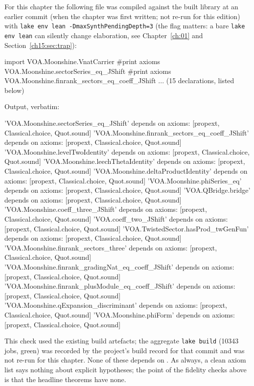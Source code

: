 For this chapter the following file was compiled against the built library at an earlier commit
(when the chapter was first written; not re-run for this edition) with \texttt{lake env lean -DmaxSynthPendingDepth=3} (the flag matters: a bare
\texttt{lake env lean} can silently change elaboration, see Chapter~\ref{ch:01} and Section~\ref{ch15:sec:trap}):
\begin{plaincode}
import VOA.Moonshine.VnatCarrier
#print axioms VOA.Moonshine.sectorSeries_eq_JShift
#print axioms VOA.Moonshine.finrank_sectors_eq_coeff_JShift
... (15 declarations, listed below)
\end{plaincode}
Output, verbatim:
\begin{plaincode}
'VOA.Moonshine.sectorSeries_eq_JShift' depends on axioms: [propext, Classical.choice, Quot.sound]
'VOA.Moonshine.finrank_sectors_eq_coeff_JShift' depends on axioms: [propext, Classical.choice, Quot.sound]
'VOA.Moonshine.levelTwoIdentity' depends on axioms: [propext, Classical.choice, Quot.sound]
'VOA.Moonshine.leechThetaIdentity' depends on axioms: [propext, Classical.choice, Quot.sound]
'VOA.Moonshine.deltaProductIdentity' depends on axioms: [propext, Classical.choice, Quot.sound]
'VOA.Moonshine.phiSeries_eq' depends on axioms: [propext, Classical.choice, Quot.sound]
'VOA.QBridge.bridge' depends on axioms: [propext, Classical.choice, Quot.sound]
'VOA.Moonshine.coeff_three_JShift' depends on axioms: [propext, Classical.choice, Quot.sound]
'VOA.coeff_two_JShift' depends on axioms: [propext, Classical.choice, Quot.sound]
'VOA.TwistedSector.hasProd_twGenFun' depends on axioms: [propext, Classical.choice, Quot.sound]
'VOA.Moonshine.finrank_sectors_three' depends on axioms: [propext, Classical.choice, Quot.sound]
'VOA.Moonshine.finrank_gradingNat_eq_coeff_JShift' depends on axioms: [propext, Classical.choice, Quot.sound]
'VOA.Moonshine.finrank_plusModule_eq_coeff_JShift' depends on axioms: [propext, Classical.choice, Quot.sound]
'VOA.Moonshine.qExpansion_discriminant' depends on axioms: [propext, Classical.choice, Quot.sound]
'VOA.Moonshine.phiForm' depends on axioms: [propext, Classical.choice, Quot.sound]
\end{plaincode}
This check used the existing build artefacts; the aggregate \texttt{lake build} (10343 jobs, green) was
recorded by the project's build record for that commit and was not re-run for this chapter.
None of these depends on . As always, a clean axiom list says nothing about explicit
hypotheses; the point of the fidelity checks above is that the headline theorems have none.


